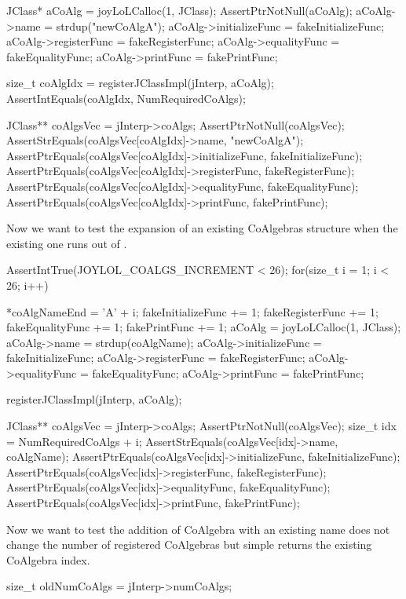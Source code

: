   JClass* aCoAlg   = joyLoLCalloc(1, JClass);
  AssertPtrNotNull(aCoAlg);
  aCoAlg->name           = strdup("newCoAlgA");
  aCoAlg->initializeFunc = fakeInitializeFunc;
  aCoAlg->registerFunc   = fakeRegisterFunc;
  aCoAlg->equalityFunc   = fakeEqualityFunc;
  aCoAlg->printFunc      = fakePrintFunc;

  size_t coAlgIdx = registerJClassImpl(jInterp, aCoAlg);
  AssertIntEquals(coAlgIdx, NumRequiredCoAlgs);

  JClass** coAlgsVec = jInterp->coAlgs;
  AssertPtrNotNull(coAlgsVec);
  AssertStrEquals(coAlgsVec[coAlgIdx]->name, "newCoAlgA");
  AssertPtrEquals(coAlgsVec[coAlgIdx]->initializeFunc, fakeInitializeFunc);
  AssertPtrEquals(coAlgsVec[coAlgIdx]->registerFunc,   fakeRegisterFunc);
  AssertPtrEquals(coAlgsVec[coAlgIdx]->equalityFunc,   fakeEqualityFunc);
  AssertPtrEquals(coAlgsVec[coAlgIdx]->printFunc,      fakePrintFunc);
\stopCTest

Now we want to test the expansion of an existing CoAlgebras structure when 
the existing one runs out of . 

\startCTest
  AssertIntTrue(JOYLOL_COALGS_INCREMENT < 26);
  for(size_t i = 1; i < 26; i++) {
    *coAlgNameEnd          = 'A' + i;
    fakeInitializeFunc    += 1;
    fakeRegisterFunc      += 1;
    fakeEqualityFunc      += 1;
    fakePrintFunc         += 1;
    aCoAlg                 = joyLoLCalloc(1, JClass);
    aCoAlg->name           = strdup(coAlgName);
    aCoAlg->initializeFunc = fakeInitializeFunc;
    aCoAlg->registerFunc   = fakeRegisterFunc;
    aCoAlg->equalityFunc   = fakeEqualityFunc;
    aCoAlg->printFunc      = fakePrintFunc;

    registerJClassImpl(jInterp, aCoAlg);

    JClass** coAlgsVec = jInterp->coAlgs;
    AssertPtrNotNull(coAlgsVec);
    size_t idx = NumRequiredCoAlgs + i;
    AssertStrEquals(coAlgsVec[idx]->name, coAlgName);
    AssertPtrEquals(coAlgsVec[idx]->initializeFunc, fakeInitializeFunc);
    AssertPtrEquals(coAlgsVec[idx]->registerFunc,   fakeRegisterFunc);
    AssertPtrEquals(coAlgsVec[idx]->equalityFunc,   fakeEqualityFunc);
    AssertPtrEquals(coAlgsVec[idx]->printFunc,      fakePrintFunc);
  }
\stopCTest

Now we want to test the addition of CoAlgebra with an existing name does 
not change the number of registered CoAlgebras but simple returns the 
existing CoAlgebra index. 

\startCTest
  size_t oldNumCoAlgs  = jInterp->numCoAlgs;

